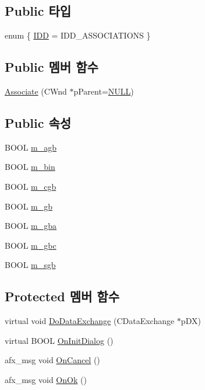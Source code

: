\subsection*{Public 타입}
\begin{DoxyCompactItemize}
\item 
enum \{ \mbox{\hyperlink{class_associate_a9696cb7dfd5bf0a5f848d1c0209ca4f8a9cf64942c919128a9b1295ae3bed6bce}{I\+DD}} = I\+D\+D\+\_\+\+A\+S\+S\+O\+C\+I\+A\+T\+I\+O\+NS
 \}
\end{DoxyCompactItemize}
\subsection*{Public 멤버 함수}
\begin{DoxyCompactItemize}
\item 
\mbox{\hyperlink{class_associate_a67a8f8b2f0539a32f8d783f60e2d25b9}{Associate}} (C\+Wnd $\ast$p\+Parent=\mbox{\hyperlink{_system_8h_a070d2ce7b6bb7e5c05602aa8c308d0c4}{N\+U\+LL}})
\end{DoxyCompactItemize}
\subsection*{Public 속성}
\begin{DoxyCompactItemize}
\item 
B\+O\+OL \mbox{\hyperlink{class_associate_ab6d59a4b47c5529c1e5f5b8f8b5a6f82}{m\+\_\+agb}}
\item 
B\+O\+OL \mbox{\hyperlink{class_associate_ac132c6bfb6f547702c2e7386650a0a4c}{m\+\_\+bin}}
\item 
B\+O\+OL \mbox{\hyperlink{class_associate_af245524b613121a7a5291deebfb97e0e}{m\+\_\+cgb}}
\item 
B\+O\+OL \mbox{\hyperlink{class_associate_af4479f05150eb128332d06cba68a955b}{m\+\_\+gb}}
\item 
B\+O\+OL \mbox{\hyperlink{class_associate_a7c20c41d1b724e80532ff888b6c7ea56}{m\+\_\+gba}}
\item 
B\+O\+OL \mbox{\hyperlink{class_associate_a399cc9528f3efc32ec5971fc5e614e97}{m\+\_\+gbc}}
\item 
B\+O\+OL \mbox{\hyperlink{class_associate_a0221f6743a817911817d464579b4a038}{m\+\_\+sgb}}
\end{DoxyCompactItemize}
\subsection*{Protected 멤버 함수}
\begin{DoxyCompactItemize}
\item 
virtual void \mbox{\hyperlink{class_associate_af10575d274826cc658ebb2e6a823aa35}{Do\+Data\+Exchange}} (C\+Data\+Exchange $\ast$p\+DX)
\item 
virtual B\+O\+OL \mbox{\hyperlink{class_associate_a66532001ec5d28abd61684b0f62b032b}{On\+Init\+Dialog}} ()
\item 
afx\+\_\+msg void \mbox{\hyperlink{class_associate_a76fb7e63100511a6d22c53cf3306b8f4}{On\+Cancel}} ()
\item 
afx\+\_\+msg void \mbox{\hyperlink{class_associate_abb81ded9b91053ed12804ee8674ae860}{On\+Ok}} ()
\end{DoxyCompactItemize}


